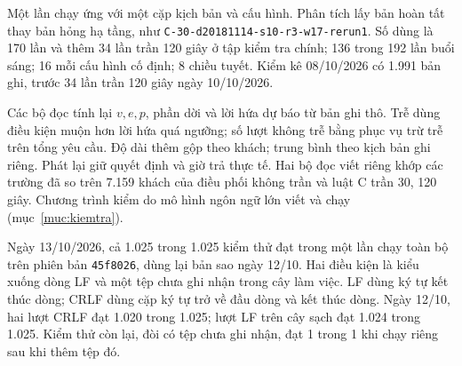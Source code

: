 Một lần chạy ứng với một cặp kịch bản và cấu hình. Phân tích lấy bản hoàn tất thay bản hỏng hạ tầng, như \nolinkurl{C-30-d20181114-s10-r3-w17-rerun1}. Số dùng là 170 lần và thêm 34 lần trần 120 giây ở tập kiểm tra chính; 136 trong 192 lần buổi sáng; 16 mỗi cấu hình cố định; 8 chiều tuyết. Kiểm kê 08/10/2026 có 1.991 bản ghi, trước 34 lần trần 120 giây ngày 10/10/2026.

Các bộ đọc tính lại $v,e,p$, phần dời và lời hứa dự báo từ bản ghi thô. Trễ dùng điều kiện muộn hơn lời hứa quá ngưỡng; số lượt không trễ bằng phục vụ trừ trễ trên tổng yêu cầu. Độ dài thêm gộp theo khách; trung bình theo kịch bản ghi riêng. Phát lại giữ quyết định và giờ trả thực tế. Hai bộ đọc viết riêng khớp các trường đã so trên 7.159 khách của điều phối không trần và luật C trần 30, 120 giây. Chương trình kiểm do mô hình ngôn ngữ lớn viết và chạy (mục~\ref{muc:kiemtra}).

Ngày 13/10/2026, cả 1.025 trong 1.025 kiểm thử đạt trong một lần chạy toàn bộ trên phiên bản \texttt{45f8026}, dùng lại bản sao ngày 12/10. Hai điều kiện là kiểu xuống dòng LF và một tệp chưa ghi nhận trong cây làm việc. LF dùng ký tự kết thúc dòng; CRLF dùng cặp ký tự trở về đầu dòng và kết thúc dòng. Ngày 12/10, hai lượt CRLF đạt 1.020 trong 1.025; lượt LF trên cây sạch đạt 1.024 trong 1.025. Kiểm thử còn lại, đòi có tệp chưa ghi nhận, đạt 1 trong 1 khi chạy riêng sau khi thêm tệp đó.
